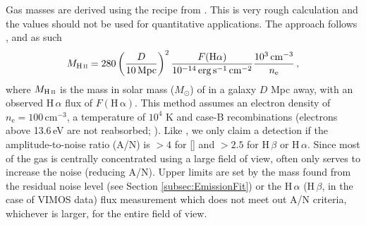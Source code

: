 		Gas masses are derived using the recipe from \citet{Sarzi2005}. This is very rough calculation and the values should not be used for quantitative applications. The approach follows \citet{Kim1989}, and as such
		\begin{equation}
			M_\text{\ion{H}{ii}} = 280 \left(\frac{D}{10\, \mathrm{Mpc}}\right)^2 \frac{F(\mathrm{H\alpha})}{10^{-14} \, \mathrm{erg \, s^{-1} \, cm^{-2}}} \frac{10^3 \, \mathrm{cm^{-3}}}{n_\mathrm{e}} \, ,
		\end{equation}
		where $M_\text{\ion{H}{ii}}$ is the mass in solar mass ($M_\odot$) of  in a galaxy $D$ Mpc away, with an observed H\,$\alpha$ flux of $F(\mathrm{H\,\alpha})$. This method assumes an electron density of $n_\mathrm{e} = 100 \, \mathrm{cm^{-3}}$, a temperature of $10^4$ K and case-B recombinations (electrons above 13.6\,eV are not reabsorbed; \citealt[e.g.][p.\,74]{Osterbrock1974}). Like \citet{Sarzi2005}, we only claim a detection if the amplitude-to-noise ratio (A/N) is $>4$ for [] and $>2.5$ for H\,$\beta$ or H\,$\alpha$. Since most of the gas is centrally concentrated using a large field of view, often only serves to increase the noise (reducing A/N). 
		Upper limits are set by the mass found from the residual noise level (see Section \ref{subsec:EmissionFit}) or the H\,$\alpha$ (H\,$\beta$, in the case of VIMOS data) flux measurement which does not meet out A/N criteria, whichever is larger, for the entire field of view.


